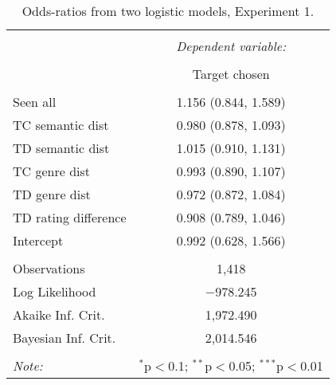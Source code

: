 
\begin{table}[!htbp] \centering 
  \caption{Odds-ratios from two logistic models, Experiment 1.} 
  \label{latentattr_exp1reg} 
\begin{tabular}{@{\extracolsep{5pt}}lc} 
\\[-1.8ex]\hline 
\hline \\[-1.8ex] 
 & \multicolumn{1}{c}{\textit{Dependent variable:}} \\ 
\cline{2-2} 
\\[-1.8ex] & Target chosen \\ 
\hline \\[-1.8ex] 
 Seen all & 1.156 (0.844, 1.589) \\ 
  TC semantic dist & 0.980 (0.878, 1.093) \\ 
  TD semantic dist & 1.015 (0.910, 1.131) \\ 
  TC genre dist & 0.993 (0.890, 1.107) \\ 
  TD genre dist & 0.972 (0.872, 1.084) \\ 
  TD rating difference & 0.908 (0.789, 1.046) \\ 
  Intercept & 0.992 (0.628, 1.566) \\ 
 \hline \\[-1.8ex] 
Observations & 1,418 \\ 
Log Likelihood & $-$978.245 \\ 
Akaike Inf. Crit. & 1,972.490 \\ 
Bayesian Inf. Crit. & 2,014.546 \\ 
\hline 
\hline \\[-1.8ex] 
\textit{Note:}  & \multicolumn{1}{r}{$^{*}$p$<$0.1; $^{**}$p$<$0.05; $^{***}$p$<$0.01} \\ 
\end{tabular} 
\end{table} 
